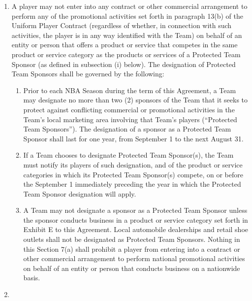 \documentclass[
]{book}
\providecommand{\tightlist}{%
  \setlength{\itemsep}{0pt}\setlength{\parskip}{0pt}}
\begin{document}
\begin{enumerate}
\def\labelenumi{(\alph{enumi})}
\tightlist
\item
  A player may not enter into any contract or other commercial arrangement to perform any of the promotional activities set forth in paragraph 13(b) of the Uniform Player Contract (regardless of whether, in connection with such activities, the player is in any way identified with the Team) on behalf of an entity or person that offers a product or service that competes in the same product or service category as the products or services of a Protected Team Sponsor (as defined in subsection (i) below). The designation of Protected Team Sponsors shall be governed by the following:

  \begin{enumerate}
  \def\labelenumii{(\roman{enumii})}
  \tightlist
  \item
    Prior to each NBA Season during the term of this Agreement, a Team may designate no more than two (2) sponsors of the Team that it seeks to protect against conflicting commercial or promotional activities in the Team's local marketing area involving that Team's players (``Protected Team Sponsors''). The designation of a sponsor as a Protected Team Sponsor shall last for one year, from September 1 to the next August 31.
  \item
    If a Team chooses to designate Protected Team Sponsor(s), the Team must notify its players of such designation, and of the product or service categories in which its Protected Team Sponsor(s) compete, on or before the September 1 immediately preceding the year in which the Protected Team Sponsor designation will apply.
  \item
    A Team may not designate a sponsor as a Protected Team Sponsor unless the sponsor conducts business in a product or service category set forth in Exhibit E to this Agreement. Local automobile dealerships and retail shoe outlets shall not be designated as Protected Team Sponsors. Nothing in this Section 7(a) shall prohibit a player from entering into a contract or other commercial arrangement to perform national promotional activities on behalf of an entity or person that conducts business on a nationwide basis.
  \end{enumerate}
\item

\end{enumerate}
\end{document}
